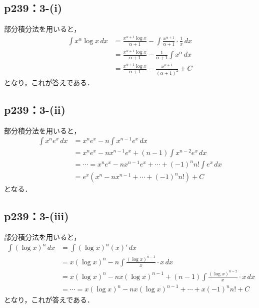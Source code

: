 \documentclass[a4paper,10pt,fleqn]{ltjsarticle}
\begin{document}
    \subsection*{p239：3-(i)}

\begin{tleftbar}
    部分積分法を用いると，
    \begin{align*}
        \int x^\alpha \log x \, dx & = \frac{x^{\alpha +1} \log x}{\alpha +1}　- \int \frac{x^{\alpha +1}}{\alpha+1} \cdot \frac{1}{x} \, dx \\
        & = \frac{x^{\alpha +1} \log x}{\alpha +1}- \frac{1}{\alpha +1} \int x^{\alpha} \, dx \\
        & = \frac{x^{\alpha+1} \log x}{\alpha +1} - \frac{x^{\alpha +1}}{(\alpha +1)^2}+ C
    \end{align*}
    となり，これが答えである．
\end{tleftbar}

\subsection*{p239：3-(ii)}

\begin{tleftbar}
    部分積分法を用いると，
    \begin{align*}
        \int x^n e^x \, dx & = x^n e^x - n \int x^{n-1} e^x \, dx \\
        & = x^n e^x - n x^{n-1} e^x + (n-1)\int x^{n-2} e^x \, dx \\
        & = \cdots = x^n e^x - n x^{n-1} e^x + \cdots + (-1)^n n! \int e^x \, dx \\
        & = e^x (x^n -n x^{n-1}+ \cdots +(-1)^n n!) + C
    \end{align*}
    となる．
\end{tleftbar}

\subsection*{p239：3-(iii)}

\begin{tleftbar}
    部分積分法を用いると，
    \begin{align*}
        \int (\log x)^n \, dx & = \int (\log x)^n  (x)' \, dx \\
        & = x (\log x)^n - n \int  \frac{(\log x)^{n-1}}{x} \cdot  x \, dx \\
        & =  x (\log x)^n - n x(\log x)^{n-1} + (n-1) \int \frac{(\log x)^{n-2}}{x} \cdot x \, dx \\
        & = \cdots = x (\log x)^n - n x(\log x)^{n-1} + \cdots + x(-1)^n n!+C
    \end{align*}
    となり，これが答えである．
\end{tleftbar}
\end{document}
